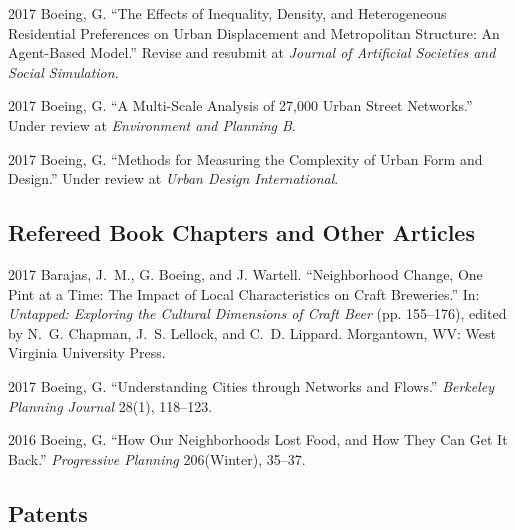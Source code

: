 \documentclass{academiccv}
\begin{document}
\begin{tablist}

\item[2017] \tab Boeing, G. \enquote{The Effects of Inequality, Density, and Heterogeneous Residential Preferences on Urban Displacement and Metropolitan Structure: An Agent-Based Model.} Revise and resubmit at \emph{Journal of Artificial Societies and Social Simulation}.

\item[2017] \tab Boeing, G. \enquote{A Multi-Scale Analysis of 27,000 Urban Street Networks.} Under review at \emph{Environment and Planning B}.

\item[2017] \tab Boeing, G. \enquote{Methods for Measuring the Complexity of Urban Form and Design.} Under review at \emph{Urban Design International}.

\end{tablist}



\subsection*{Refereed Book Chapters and Other Articles}

\begin{tablist}

\item[2017] \tab Barajas, J.~M., G. Boeing, and J. Wartell. \enquote{Neighborhood Change, One Pint at a Time: The Impact of Local Characteristics on Craft Breweries.} In: \emph{Untapped: Exploring the Cultural Dimensions of Craft Beer} (pp. 155--176), edited by N.~G. Chapman, J.~S. Lellock, and C.~D. Lippard. Morgantown, WV: West Virginia University Press.

\item[2017] \tab Boeing, G. \enquote{Understanding Cities through Networks and Flows.} \emph{Berkeley Planning Journal} 28(1), 118--123.

\item[2016] \tab Boeing, G. \enquote{How Our Neighborhoods Lost Food, and How They Can Get It Back.} \emph{Progressive Planning} 206(Winter), 35--37.

\end{tablist}



\subsection*{Patents}
\end{document}
